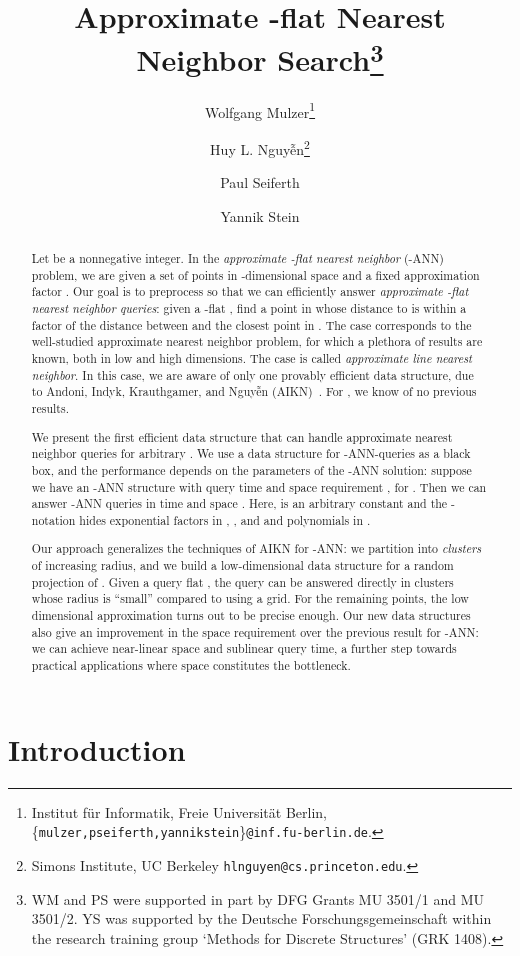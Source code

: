 \documentclass[a4paper,11pt]{paper}
\title{Approximate -flat Nearest Neighbor
  Search\thanks{WM and PS
were supported in part by DFG Grants MU 3501/1 and MU 3501/2.
YS was supported by the Deutsche Forschungsgemeinschaft within
the research training group `Methods for Discrete Structures'
(GRK 1408).}}
\author
{
Wolfgang Mulzer\thanks{Institut f\"ur Informatik,
Freie Universit\"at Berlin,
\{\texttt{mulzer,pseiferth,yannikstein}\}\texttt{@inf.fu-berlin.de}.}
\and
Huy L. Nguy\~{\^{e}}n\thanks{Simons Institute, UC Berkeley
\texttt{hlnguyen@cs.princeton.edu}.}
\and
Paul Seiferth\footnotemark[2]
\and
Yannik Stein\footnotemark[2]
}
\begin{document}
\maketitle

\begin{abstract}
Let  be a nonnegative integer.
In the \emph{approximate -flat nearest neighbor}
(-ANN) problem, we are given a set
 of  points in
-dimensional space and a fixed approximation
factor . Our goal is to
preprocess  so that we can efficiently
answer \emph{approximate -flat nearest
neighbor queries}: given a -flat ,
find a point in  whose distance to
 is within a factor   of the
distance between  and the closest
point in . The case  corresponds to
the well-studied approximate nearest neighbor
problem, for which a plethora of results are known,
both in low and high dimensions.
The case  is called \emph{approximate line
nearest neighbor}. In this case, we are aware of only
one provably efficient data structure, due to
Andoni, Indyk, Krauthgamer,
and Nguy\~{\^{e}}n (AIKN)~\cite{AndoniInKrNg09}.
For , we know of no previous results.

We present the first efficient data structure that
can handle approximate nearest neighbor queries for
arbitrary . We use a data structure
for -ANN-queries as a black box, and the performance
depends on the parameters of the -ANN
solution: suppose we have an -ANN structure
with query time  and space requirement
, for .
Then we can answer -ANN queries in time
 and space
.
Here,  is an arbitrary constant and the -notation
hides exponential factors in , , and  and
polynomials in .

Our approach generalizes the techniques of AIKN for
-ANN: we partition  into \emph{clusters} of increasing
radius, and we build a low-dimensional data structure for
a random projection of . Given a query flat , the
query can be answered directly in clusters whose radius is
``small'' compared to  using a grid. For the
remaining points, the low dimensional approximation turns out to
be precise enough.
Our new data structures also give an improvement in the space
requirement over the previous result for -ANN: we can achieve
near-linear space and sublinear query time, a further step
towards practical applications where space  constitutes
the bottleneck.
\end{abstract}
\newpage
\setcounter{page}{1}

\section{Introduction}
\end{document}
